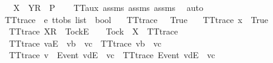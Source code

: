 \ \ \ {\isachardoublequoteopen}{\isacharbrackleft}{\isacharbrackleft}X\ {\isasymunion}\ Y{\isacharbrackright}\isactrlsub R{\isacharbrackright}\ {\isasymin}\ P{\isachardoublequoteclose}\isanewline
%
\isadelimproof
\ \ %
\endisadelimproof
%
\isatagproof
{}\isamarkupfalse%
\ TT{}{\isacharunderscore}aux{}\ assms{\isacharparenleft}{}{\isacharparenright}\ assms{\isacharparenleft}{}{\isacharparenright}\ assms{\isacharparenleft}{}{\isacharparenright}\ \isamarkupfalse%
\ auto%
\endisatagproof
{\isafoldproof}%
%
\isadelimproof
\isanewline
%
\endisadelimproof
\isanewline
{}\isamarkupfalse%
\ TT{}{\isacharunderscore}trace\ {\isacharcolon}{\isacharcolon}\ {\isachardoublequoteopen}{\isacharprime}e\ ttobs\ list\ {\isasymRightarrow}\ bool{\isachardoublequoteclose}\ \isanewline
\ \ {\isachardoublequoteopen}TT{}{\isacharunderscore}trace\ {\isacharbrackleft}{\isacharbrackright}\ {\isacharequal}\ True{\isachardoublequoteclose}\ {\isacharbar}\isanewline
\ \ {\isachardoublequoteopen}TT{}{\isacharunderscore}trace\ {\isacharbrackleft}x{\isacharbrackright}\ {\isacharequal}\ True{\isachardoublequoteclose}\ {\isacharbar}\isanewline
\ \ {\isachardoublequoteopen}TT{}{\isacharunderscore}trace\ {\isacharparenleft}{\isacharbrackleft}X{\isacharbrackright}\isactrlsub R\ {\isacharhash}\ {\isacharbrackleft}Tock{\isacharbrackright}\isactrlsub E\ {\isacharhash}\ {\isasymrho}{\isacharparenright}\ {\isacharequal}\ {\isacharparenleft}Tock\ {\isasymnotin}\ X\ {\isasymand}\ TT{}{\isacharunderscore}trace\ {\isasymrho}{\isacharparenright}{\isachardoublequoteclose}\ {\isacharbar}\isanewline
\ \ {\isachardoublequoteopen}TT{}{\isacharunderscore}trace\ {\isacharparenleft}{\isacharbrackleft}va{\isacharbrackright}\isactrlsub E\ {\isacharhash}\ vb\ {\isacharhash}\ vc{\isacharparenright}\ {\isacharequal}\ TT{}{\isacharunderscore}trace\ {\isacharparenleft}vb\ {\isacharhash}\ vc{\isacharparenright}{\isachardoublequoteclose}\ {\isacharbar}\isanewline
\ \ {\isachardoublequoteopen}TT{}{\isacharunderscore}trace\ {\isacharparenleft}v\ {\isacharhash}\ {\isacharbrackleft}Event\ vd{\isacharbrackright}\isactrlsub E\ {\isacharhash}\ vc{\isacharparenright}\ {\isacharequal}\ TT{}{\isacharunderscore}trace\ {\isacharparenleft}{\isacharbrackleft}Event\ vd{\isacharbrackright}\isactrlsub E\ {\isacharhash}\ vc{\isacharparenright}{\isachardoublequoteclose}\ {\isacharbar}\isanewline
